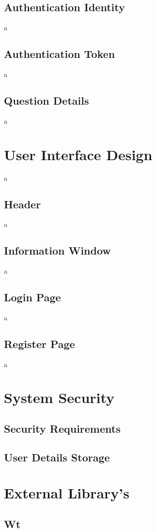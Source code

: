 \subsection{Authentication Identity}
a
\subsection{Authentication Token}
a
\subsection{Question Details}
a

\section{User Interface Design}
a
\subsection{Header}
a
\subsection{Information Window}
a
\subsection{Login Page}
a
\subsection{Register Page}
a

\section{System Security}
\subsection{Security Requirements}
\subsection{User Details Storage}

\section{External Library's}
\subsection{Wt}

